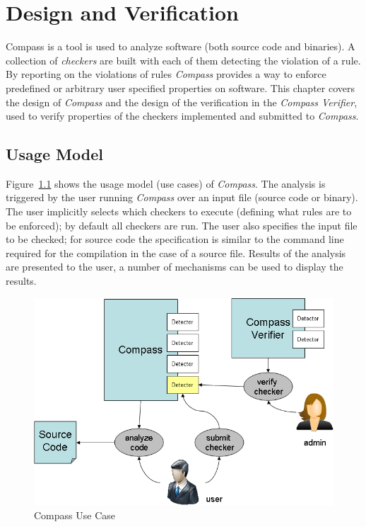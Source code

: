 
\chapter{Design and Verification}

Compass is a tool is used to analyze software (both source code and binaries). 
A collection of {\em checkers} are built with each of them detecting the 
violation of a rule.  By reporting on the violations of rules {\em Compass} provides 
a way to enforce predefined or arbitrary user specified properties on software.
This chapter covers the design of {\em Compass} and the design of the verification in 
the \emph{Compass Verifier}, used to verify properties of the checkers implemented 
and submitted to {\em Compass}.

\section{Usage Model}

\label{design::UseCase}

Figure~\ref{Compass_usecase} shows the usage model (use cases) of \emph{Compass}.
The analysis is triggered by the user running {\em Compass} over an
input file (source code or binary). The user implicitly selects 
which checkers to execute (defining what rules are to be enforced); 
by default all checkers are run. 
The user also specifies the input file to be checked; for source code 
the specification is similar to the command line required for the 
compilation in the case of a source file.  Results of the analysis 
are presented to the user, a number of mechanisms can be used to 
display the results.

\begin{figure}[th]
\includegraphics[width=4.5in]{compass_pic.png}
\caption{Compass Use Case}
\label{Compass_usecase}
\end{figure}

